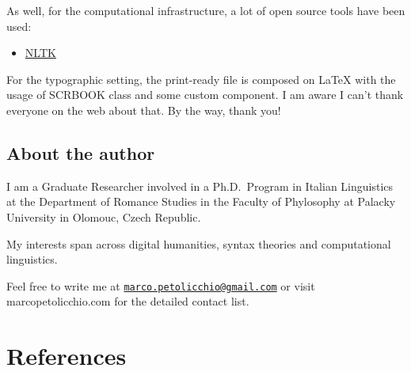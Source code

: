 \documentclass[a4paper,twoside,11pt,chapterprefix=true,listof=totocnumbered,bibliography=totocnumbered]{scrbook}
\providecommand{\tightlist}{%
  \setlength{\itemsep}{0pt}\setlength{\parskip}{0pt}}
\theoremstyle{definition}
\theoremstyle{definition}
\theoremstyle{definition}
\theoremstyle{remark}
\begin{document}
As well, for the computational infrastructure, a lot of open source
tools have been used:

\begin{itemize}
\tightlist
\item
  \href{https://bookdown.org}{NLTK}
\end{itemize}

For the typographic setting, the print-ready file is composed on LaTeX
with the usage of SCRBOOK class and some custom component. I am aware I
can't thank everyone on the web about that. By the way, thank you!

\section*{About the author}\label{about-the-author}

I am a Graduate Researcher involved in a Ph.D.~Program in Italian
Linguistics at the Department of Romance Studies in the Faculty of
Phylosophy at Palacky University in Olomouc, Czech Republic.

My interests span across digital humanities, syntax theories and
computational linguistics.

Feel free to write me at
\href{mailto:marco.petolicchio@gmail.com}{\nolinkurl{marco.petolicchio@gmail.com}}
or visit marcopetolicchio.com for the detailed contact list.

\chapter*{References}\label{references}


\end{document}
